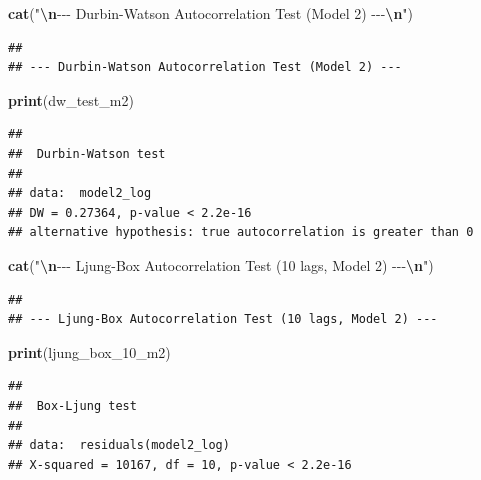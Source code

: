 \documentclass[
]{article}
\newenvironment{Shaded}{\begin{snugshade}}{\end{snugshade}}
\newcommand{\FunctionTok}[1]{\textcolor[rgb]{0.13,0.29,0.53}{\textbf{#1}}}
\newcommand{\NormalTok}[1]{#1}
\newcommand{\SpecialCharTok}[1]{\textcolor[rgb]{0.81,0.36,0.00}{\textbf{#1}}}
\newcommand{\StringTok}[1]{\textcolor[rgb]{0.31,0.60,0.02}{#1}}
\begin{document}
\begin{Shaded}
\begin{Highlighting}[]
    \FunctionTok{cat}\NormalTok{(}\StringTok{"}\SpecialCharTok{\textbackslash{}n}\StringTok{{-}{-}{-} Durbin{-}Watson Autocorrelation Test (Model 2) {-}{-}{-}}\SpecialCharTok{\textbackslash{}n}\StringTok{"}\NormalTok{)}
\end{Highlighting}
\end{Shaded}

\begin{verbatim}
## 
## --- Durbin-Watson Autocorrelation Test (Model 2) ---
\end{verbatim}

\begin{Shaded}
\begin{Highlighting}[]
    \FunctionTok{print}\NormalTok{(dw\_test\_m2)}
\end{Highlighting}
\end{Shaded}

\begin{verbatim}
## 
##  Durbin-Watson test
## 
## data:  model2_log
## DW = 0.27364, p-value < 2.2e-16
## alternative hypothesis: true autocorrelation is greater than 0
\end{verbatim}

\begin{Shaded}
\begin{Highlighting}[]
    \FunctionTok{cat}\NormalTok{(}\StringTok{"}\SpecialCharTok{\textbackslash{}n}\StringTok{{-}{-}{-} Ljung{-}Box Autocorrelation Test (10 lags, Model 2) {-}{-}{-}}\SpecialCharTok{\textbackslash{}n}\StringTok{"}\NormalTok{)}
\end{Highlighting}
\end{Shaded}

\begin{verbatim}
## 
## --- Ljung-Box Autocorrelation Test (10 lags, Model 2) ---
\end{verbatim}

\begin{Shaded}
\begin{Highlighting}[]
    \FunctionTok{print}\NormalTok{(ljung\_box\_10\_m2)}
\end{Highlighting}
\end{Shaded}

\begin{verbatim}
## 
##  Box-Ljung test
## 
## data:  residuals(model2_log)
## X-squared = 10167, df = 10, p-value < 2.2e-16
\end{verbatim}
\end{document}
